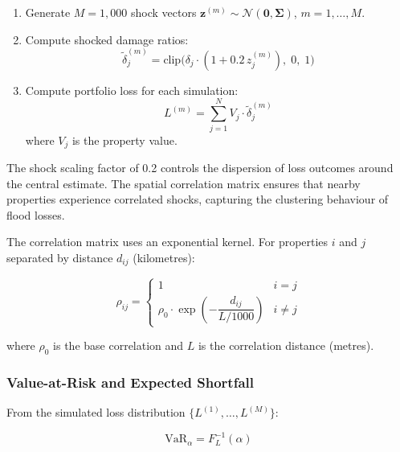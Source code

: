 \documentclass[11pt,a4paper]{article}
\begin{document}
\begin{enumerate}[nosep]
    \item Generate $M = 1{,}000$ shock vectors
          $\boldsymbol{z}^{(m)} \sim \mathcal{N}(\mathbf{0}, \boldsymbol{\Sigma})$,
          $m = 1, \ldots, M$.
    \item Compute shocked damage ratios:
          \begin{equation}
              \tilde{\delta}_j^{(m)} = \text{clip}\!\big(\delta_j \cdot (1 + 0.2 \, z_j^{(m)}),
              \; 0, \; 1\big)
              \label{eq:shocked_damage}
          \end{equation}
    \item Compute portfolio loss for each simulation:
          \begin{equation}
              L^{(m)} = \sum_{j=1}^{N} V_j \cdot \tilde{\delta}_j^{(m)}
              \label{eq:portfolio_loss}
          \end{equation}
          where $V_j$ is the property value.
\end{enumerate}

\noindent The shock scaling factor of 0.2 controls the dispersion of loss outcomes
around the central estimate. The spatial correlation matrix ensures that nearby
properties experience correlated shocks, capturing the clustering behaviour of flood
losses.

The correlation matrix uses an exponential kernel. For properties $i$ and $j$
separated by distance $d_{ij}$ (kilometres):

\begin{equation}
    \rho_{ij} = \begin{cases}
        1 & i = j \\[4pt]
        \rho_0 \cdot \exp\!\left(-\dfrac{d_{ij}}{L / 1000}\right) & i \neq j
    \end{cases}
    \label{eq:corr_matrix}
\end{equation}

\noindent where $\rho_0$ is the base correlation and $L$ is the correlation distance
(metres).

\subsubsection{Value-at-Risk and Expected Shortfall}

From the simulated loss distribution $\{L^{(1)}, \ldots, L^{(M)}\}$:

\begin{equation}
    \text{VaR}_\alpha = F_L^{-1}(\alpha)
    \label{eq:var}
\end{equation}
\end{document}
